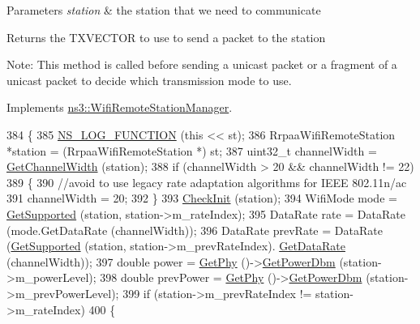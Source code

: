 \begin{DoxyParams}{Parameters}
{\em station} & the station that we need to communicate\\
\hline
\end{DoxyParams}
\begin{DoxyReturn}{Returns}
the T\+X\+V\+E\+C\+T\+OR to use to send a packet to the station
\end{DoxyReturn}
Note\+: This method is called before sending a unicast packet or a fragment of a unicast packet to decide which transmission mode to use. 

Implements \hyperlink{classns3_1_1WifiRemoteStationManager_a5a6b2bfcd4959da43c54f0072bd01202}{ns3\+::\+Wifi\+Remote\+Station\+Manager}.


\begin{DoxyCode}
384 \{
385   \hyperlink{log-macros-disabled_8h_a90b90d5bad1f39cb1b64923ea94c0761}{NS\_LOG\_FUNCTION} (\textcolor{keyword}{this} << st);
386   RrpaaWifiRemoteStation *station = (RrpaaWifiRemoteStation *) st;
387   uint32\_t channelWidth = \hyperlink{classns3_1_1WifiRemoteStationManager_a918213c5b9fa629c4986f6d90521bbd4}{GetChannelWidth} (station);
388   \textcolor{keywordflow}{if} (channelWidth > 20 && channelWidth != 22)
389     \{
390       \textcolor{comment}{//avoid to use legacy rate adaptation algorithms for IEEE 802.11n/ac}
391       channelWidth = 20;
392     \}
393   \hyperlink{classns3_1_1RrpaaWifiManager_a37fd1f9711566d9def5f31c966a89bb5}{CheckInit} (station);
394   WifiMode mode = \hyperlink{classns3_1_1WifiRemoteStationManager_a995c8bae0d84b168fd3e8bc9ecaacdd4}{GetSupported} (station, station->m\_rateIndex);
395   DataRate rate = DataRate (mode.GetDataRate (channelWidth));
396   DataRate prevRate = DataRate (\hyperlink{classns3_1_1WifiRemoteStationManager_a995c8bae0d84b168fd3e8bc9ecaacdd4}{GetSupported} (station, station->m\_prevRateIndex).
      \hyperlink{classns3_1_1WifiMode_adcfbe150f69da720db23387f733b8a52}{GetDataRate} (channelWidth));
397   \textcolor{keywordtype}{double} power = \hyperlink{classns3_1_1WifiRemoteStationManager_ab92b49cf78e0b72a51f5d13a1f15e242}{GetPhy} ()->\hyperlink{classns3_1_1WifiPhy_a91fbc9ea51bb2ac6114cad1f70e25af0}{GetPowerDbm} (station->m\_powerLevel);
398   \textcolor{keywordtype}{double} prevPower = \hyperlink{classns3_1_1WifiRemoteStationManager_ab92b49cf78e0b72a51f5d13a1f15e242}{GetPhy} ()->\hyperlink{classns3_1_1WifiPhy_a91fbc9ea51bb2ac6114cad1f70e25af0}{GetPowerDbm} (station->m\_prevPowerLevel);
399   \textcolor{keywordflow}{if} (station->m\_prevRateIndex != station->m\_rateIndex)
400     \{

\end{DoxyCode}
